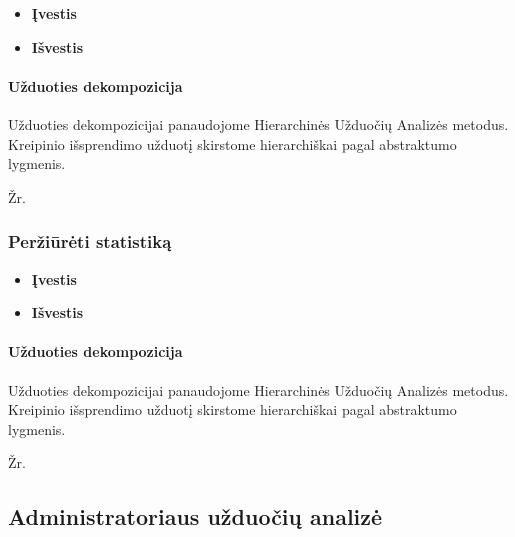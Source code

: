 		\begin{itemize}
			\item \textbf{Įvestis}
			\item \textbf{Išvestis} 
		\end{itemize}
		
		
	\paragraph{Užduoties dekompozicija}
	

	Užduoties dekompozicijai panaudojome Hierarchinės Užduočių Analizės metodus.
	Kreipinio išsprendimo užduotį skirstome hierarchiškai pagal abstraktumo lygmenis. 
	
	Žr. 
	
	\subsubsection{Peržiūrėti statistiką}

		\begin{itemize}
			\item \textbf{Įvestis}
			\item \textbf{Išvestis} 
		\end{itemize}
		
		
	\paragraph{Užduoties dekompozicija}
	

	Užduoties dekompozicijai panaudojome Hierarchinės Užduočių Analizės metodus.
	Kreipinio išsprendimo užduotį skirstome hierarchiškai pagal abstraktumo lygmenis. 
	
	Žr. 
	
 	
\subsection{Administratoriaus užduočių analizė}

